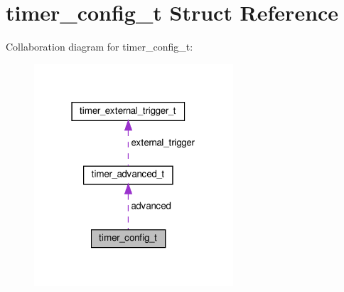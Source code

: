 \hypertarget{structtimer__config__t}{}\section{timer\+\_\+config\+\_\+t Struct Reference}
\label{structtimer__config__t}


Collaboration diagram for timer\+\_\+config\+\_\+t\+:\nopagebreak
\begin{figure}[H]
\begin{center}
\leavevmode
\includegraphics[width=210pt]{structtimer__config__t__coll__graph}
\end{center}
\end{figure}
